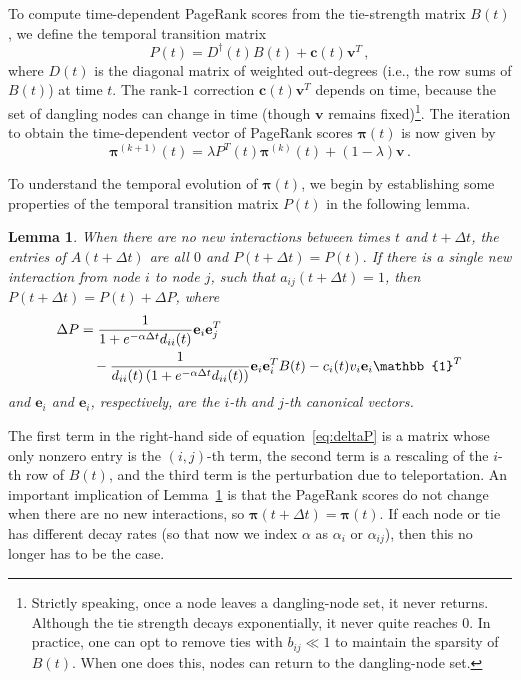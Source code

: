 \documentclass[journal,transmag]{IEEEtran}
\newtheorem{lemma}{Lemma}
\newcommand{\mat}[1]{\mathbf{#1}}
\newcommand{\gvec}[1]{\bm{#1}}
\newcommand{\vecb}[1]{\mathbf{#1}}
\newcommand{\tdt}{t+\Delta t}
\newcommand{\dP}{\Delta P}
\newcommand{\vpi}{\gvec{\pi}}
\begin{document}
To compute time-dependent PageRank scores from the tie-strength matrix
$B(t)$, we define the temporal transition matrix
\begin{equation}
 	 P(t) = D^{\dagger}(t)B(t) + \vecb{c}(t)\vecb{v}^T\,,
\label{eq:Ptemp}
\end{equation}
where $D(t)$ is the diagonal matrix of weighted out-degrees (i.e., the
row sums of $B(t)$) at time $t$. The rank-$1$ correction
$\vecb{c}(t)\vecb{v}^T$ depends on time, because the set of dangling
nodes can change in time (though $\vecb{v}$ remains
fixed)\footnote{Strictly speaking, once a node leaves a dangling-node set,
    it never returns. Although the tie strength decays exponentially,
    it never quite reaches $0$. In practice, one can
      opt to remove ties with $b_{ij}\ll 1$ to maintain the sparsity
    of $B(t)$. When one does this, nodes can return to the dangling-node
    set.}. The iteration to obtain the
time-dependent vector of PageRank scores $\vpi(t)$ is now given by
\begin{equation}
 	 \vpi^{\left(k+1\right)}(t) = \lambda P^T(t) \vpi^{\left(k\right)}(t) 
  + (1-\lambda)\mat{v}\,.
  \label{eq:priteration}
\end{equation}

To understand the temporal evolution of $\vpi(t)$, we begin by
establishing some properties of the temporal transition matrix $P(t)$
in the following lemma.


\begin{lemma}
  \label{lemma:no_inter}
  When there are no new interactions between times $t$ and $\tdt$, the
  entries of $A(\tdt)$ are all $0$ and $P(\tdt) = P(t).$ If there is a
  single new interaction from node $i$ to node $j$, such that
  $a_{ij}(\tdt)=1$, then $P(\tdt) = P(t) + \dP$, where
  \begin{align}
    \dP &= \frac{1}{1+e^{-\alpha \Delta
        t}d_{ii}(t)}\vecb{e}_{i}\vecb{e}_{j}^T \notag \\
        	&\quad - \frac{1}
        {d_{ii}(t)\left(1+e^{-\alpha \Delta t}d_{ii}(t)\right)}
        \vecb{e}_{i}\vecb{e}_{i}^T B(t)
        -c_i(t)v_i\vecb{e}_i\mathbb{1}^T
  \label{eq:deltaP}
  \end{align}
  and $\vecb{e}_{i}$ and $\vecb{e}_{i}$, respectively, are the $i$-th and $j$-th
canonical vectors.
\end{lemma}
The first term in the right-hand side of equation~\eqref{eq:deltaP} is
a matrix whose only nonzero entry is the $(i,j)$-th term, the second
term is a rescaling of the $i$-th row of $B(t)$, and the
third term is the perturbation due to teleportation.  An important
implication of Lemma~\ref{lemma:no_inter} is that the PageRank scores do not change when there are no
new interactions, so $\vpi(\tdt)=\vpi(t)$. If each node or tie has different decay rates
(so that now we index $\alpha$ as $\alpha_i$ or $\alpha_{ij}$), then
this no longer has to be the case.
\end{document}
